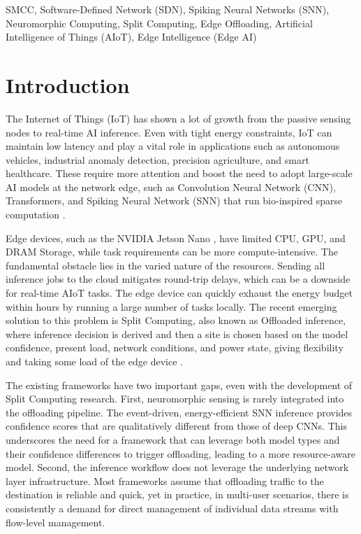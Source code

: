 \documentclass[journal]{IEEEtran}
\begin{document}
\begin{IEEEkeywords}
SMCC, Software-Defined Network (SDN), Spiking Neural Networks (SNN), Neuromorphic
Computing, Split Computing, Edge Offloading, Artificial Intelligence of Things (AIoT), Edge Intelligence (Edge AI)
\end{IEEEkeywords}

\section{Introduction}
\label{sec:intro}
The Internet of Things (IoT) has shown a lot of growth from the passive sensing nodes to real-time AI inference. Even with tight energy constraints, IoT can maintain low latency and play a vital role in applications such as autonomous vehicles, industrial anomaly detection, precision agriculture, and smart healthcare. These require more attention and boost the need to adopt large-scale AI models at the network edge, such as Convolution Neural Network (CNN), Transformers, and Spiking Neural Network (SNN) that run bio-inspired sparse computation \cite{shi2016edge,satyanarayanan2017emergence,mach2017mobile,mao2017survey,feng2022computation,al2021deep}.

Edge devices, such as the NVIDIA Jetson Nano \cite{nano2025nvidia}, have limited CPU, GPU, and DRAM Storage, while task requirements can be more compute-intensive. The fundamental obstacle lies in the varied nature of the resources. Sending all inference jobs to the cloud mitigates round-trip delays, which can be a downside for real-time AIoT tasks. The edge device can quickly exhaust the energy budget within hours by running a large number of tasks locally. The recent emerging solution to this problem is Split Computing, also known as Offloaded inference, where inference decision is derived and then a site is chosen based on the model confidence, present load, network conditions, and power state, giving flexibility and taking some load of the edge device \cite{teerapittayanon2017distributed,chang2021survey,10534618,karjee2022split,wang2024end}.

The existing frameworks have two important gaps, even with the development of Split Computing research. First, neuromorphic sensing is rarely integrated into the offloading pipeline. The event-driven, energy-efficient SNN inference provides confidence scores that are qualitatively different from those of deep CNNs. This underscores the need for a framework that can leverage both model types and their confidence differences to trigger offloading, leading to a more resource-aware model. Second, the inference workflow does not leverage the underlying network layer infrastructure. Most frameworks assume that offloading traffic to the destination is reliable and quick, yet in practice, in multi-user scenarios, there is consistently a demand for direct management of individual data streams with flow-level management.
\end{document}
